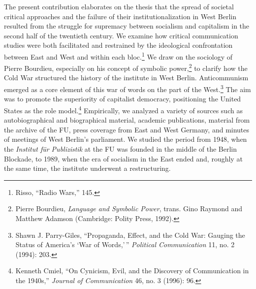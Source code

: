 \documentclass{tufte-handout}
\begin{document}
The present contribution elaborates on the thesis that the spread of
societal critical approaches and the failure of their
institutionalization in West Berlin resulted from the struggle for
supremacy between socialism and capitalism in the second half of the
twentieth century. We examine how critical communication studies were
both facilitated and restrained by the ideological confrontation between
East and West and within each bloc.\footnote{Risso, ``Radio Wars,'' 145.}
We draw on the sociology of Pierre Bourdieu, especially on his concept
of symbolic power,\footnote{Pierre Bourdieu, \emph{Language and Symbolic
  Power}, trans. Gino Raymond and Matthew Adamson (Cambridge: Polity
  Press, 1992).} to clarify how the Cold War structured the history of
the institute in West Berlin. Anticommunism emerged as a core element of
this war of words on the part of the West.\footnote{Shawn J.
  Parry-Giles, ``Propaganda, Effect, and the Cold War: Gauging the
  Status of America's `War of Words,'\,'' \emph{Political Communication}
  11, no. 2 (1994): 203.} The aim was to promote the superiority of
capitalist democracy, positioning the United States as the role
model.\footnote{Kenneth Cmiel, ``On Cynicism, Evil, and the Discovery of
  Communication in the 1940s,'' \emph{Journal of Communication} 46, no.
  3 (1996): 96.} Empirically, we analyzed a variety of sources such as
autobiographical and biographical material, academic publications,
material from the archive of the FU, press coverage from East and West
Germany, and minutes of meetings of West Berlin's parliament. We studied
the period from 1948, when the \emph{Institut für Publizistik} at the FU
was founded in the middle of the Berlin Blockade, to 1989, when the era
of socialism in the East ended and, roughly at the same time, the
institute underwent a restructuring.
\end{document}
